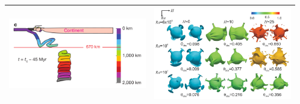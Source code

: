 \begin{tabular}{p{8cm}p{8cm}}
\includegraphics[width=6cm]{images/beautiful/simi13} \cite{simi13} &
\includegraphics[width=6cm]{images/beautiful/oflb13} \cite{oflb13} \\ \hline
\end{tabular}



\begin{center}
\end{center}
